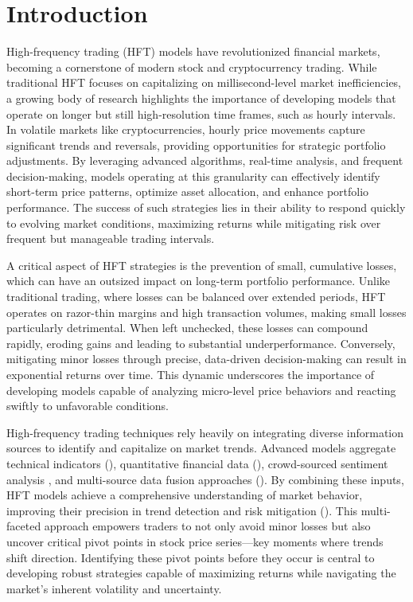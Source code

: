\section{Introduction}
High-frequency trading (HFT) models have revolutionized financial markets, becoming a cornerstone of modern stock and cryptocurrency trading. While traditional HFT focuses on capitalizing on millisecond-level market inefficiencies, a growing body of research highlights the importance of developing models that operate on longer but still high-resolution time frames, such as hourly intervals. In volatile markets like cryptocurrencies, hourly price movements capture significant trends and reversals, providing opportunities for strategic portfolio adjustments. By leveraging advanced algorithms, real-time analysis, and frequent decision-making, models operating at this granularity can effectively identify short-term price patterns, optimize asset allocation, and enhance portfolio performance. The success of such strategies lies in their ability to respond quickly to evolving market conditions, maximizing returns while mitigating risk over frequent but manageable trading intervals.

A critical aspect of HFT strategies is the prevention of small, cumulative losses, which can have an outsized impact on long-term portfolio performance. Unlike traditional trading, where losses can be balanced over extended periods, HFT operates on razor-thin margins and high transaction volumes, making small losses particularly detrimental. When left unchecked, these losses can compound rapidly, eroding gains and leading to substantial underperformance. Conversely, mitigating minor losses through precise, data-driven decision-making can result in exponential returns over time. This dynamic underscores the importance of developing models capable of analyzing micro-level price behaviors and reacting swiftly to unfavorable conditions.

High-frequency trading techniques rely heavily on integrating diverse information sources to identify and capitalize on market trends. Advanced models aggregate technical indicators (\citet{chen2018profitability}), quantitative financial data (\citet{gomber2015high}), crowd-sourced sentiment analysis \citet{liu2023multi}, and multi-source data fusion approaches (\citet{asadi4423354multi, liu2023multi}). By combining these inputs, HFT models achieve a comprehensive understanding of market behavior, improving their precision in trend detection and risk mitigation (\citet{li2014online}). This multi-faceted approach empowers traders to not only avoid minor losses but also uncover critical pivot points in stock price series—key moments where trends shift direction. Identifying these pivot points before they occur is central to developing robust strategies capable of maximizing returns while navigating the market's inherent volatility and uncertainty.

